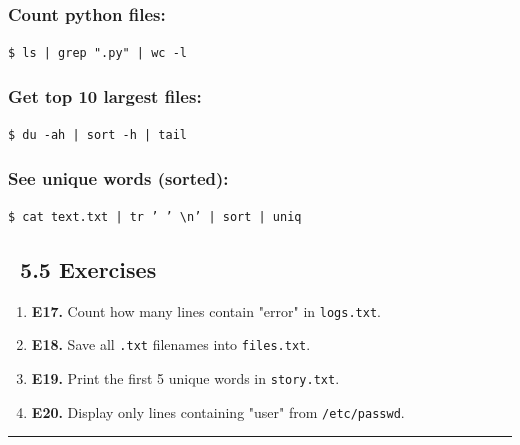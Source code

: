 \documentclass[12pt]{article}
\newcommand{\exerciseicon}{\faTasks}
\begin{document}
\subsubsection*{Count python files:}

\begin{highlightbox}
\texttt{\$ ls | grep ".py" | wc -l}
\end{highlightbox}

\subsubsection*{Get top 10 largest files:}

\begin{highlightbox}
\texttt{\$ du -ah | sort -h | tail}
\end{highlightbox}

\subsubsection*{See unique words (sorted):}

\begin{highlightbox}
\texttt{\$ cat text.txt | tr ' ' \textbackslash n' | sort | uniq}
\end{highlightbox}

\subsection*{\exerciseicon\ 5.5 Exercises}

\begin{enumerate}
    \item \textbf{E17.} Count how many lines contain "error" in \texttt{logs.txt}.
    
    \item \textbf{E18.} Save all \texttt{.txt} filenames into \texttt{files.txt}.
    
    \item \textbf{E19.} Print the first 5 unique words in \texttt{story.txt}.
    
    \item \textbf{E20.} Display only lines containing "user" from \texttt{/etc/passwd}.
\end{enumerate}

\vspace{1em}
\begin{center}
\color{teamred}\rule{0.8\textwidth}{1pt}
\end{center}
\end{document}
